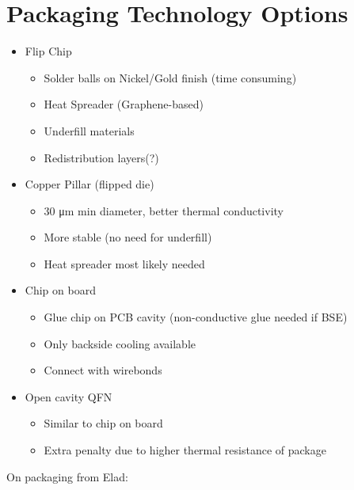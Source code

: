 
\section{Packaging Technology Options}

\begin{itemize}
	\item Flip Chip
	\begin{itemize}
		\item Solder balls on Nickel/Gold finish (time consuming) %
		\item Heat Spreader (Graphene-based)
		\item Underfill materials
		\item Redistribution layers(?)
	\end{itemize}
	\item Copper Pillar (flipped die)
	\begin{itemize}
		\item 30 \unit{\micro \metre} min diameter, better thermal conductivity
		\item More stable (no need for underfill)
		\item Heat spreader most likely needed
	\end{itemize}
	\item Chip on board
	\begin{itemize}
		\item Glue chip on PCB cavity (non-conductive glue needed if BSE)
		\item Only backside cooling available
		\item Connect with wirebonds
	\end{itemize}
	\item Open cavity QFN
	\begin{itemize}
		\item Similar to chip on board
		\item Extra penalty due to higher thermal resistance of package
	\end{itemize}
\end{itemize}

On packaging from Elad:

